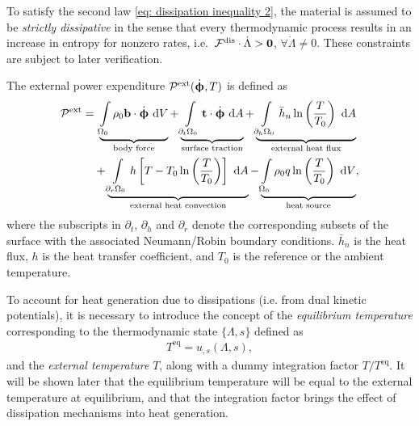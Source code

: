 To satisfy the second law \eqref{eq: dissipation inequality 2}, the material is assumed to be \emph{strictly dissipative} in the sense that every thermodynamic process results in an increase in entropy for nonzero rates, i.e.\ $\mathcal{F}^\text{dis}\cdot\dot{\Lambda} > \boldsymbol{0}$, $\forall \dot{\Lambda} \neq 0$. These constraints are subject to later verification.

The external power expenditure $\mathcal{P}^\text{ext}(\dot{\boldsymbol{\upphi}}, T)$ is defined as
\begin{equation}
\begin{aligned}
  \mathcal{P}^\text{ext} = & \ \underbrace{\int\limits_{\Omega_0} \rho_0 \textbf{b} \cdot \dot{\boldsymbol{\upphi}} \text{ d}V}_\text{body force} + \underbrace{\int\limits_{\partial_t\Omega_0} \textbf{t} \cdot \dot{\boldsymbol{\upphi}} \text{ d}A}_\text{surface traction} + \underbrace{\int\limits_{\partial_h\Omega_0} \bar{h}_n\ln\left( \dfrac{T}{T_0} \right) \text{ d}A}_\text{external heat flux} \\
                           & + \underbrace{\int\limits_{\partial_r\Omega_0} h\left[ T - T_0 \ln\left( \dfrac{T}{T_0} \right) \right] \text{ d}A}_\text{external heat convection} - \underbrace{\int\limits_{\Omega_0} \rho_0 q \ln\left( \dfrac{T}{T_0} \right) \text{ d}V}_\text{heat source},
\end{aligned}\label{eq: external power}
\end{equation}
where the subscripts in $\partial_t$, $\partial_h$ and $\partial_r$ denote the corresponding subsets of the surface with the associated Neumann/Robin boundary conditions. $\bar{h}_n$ is the heat flux, $h$ is the heat transfer coefficient, and $T_0$ is the reference or the ambient temperature.

To account for heat generation due to dissipations (i.e. from dual kinetic potentials), it is necessary to introduce the concept of the \emph{equilibrium temperature} corresponding to the thermodynamic state $\{ \Lambda, s \}$ defined as
\begin{align}
    T^\text{eq} = u_{,s}(\Lambda, s),
\end{align}
and the \emph{external temperature} $T$, along with a dummy integration factor $T/T^\text{eq}$. It will be shown later that the equilibrium temperature will be equal to the external temperature at equilibrium, and that the integration factor brings the effect of dissipation mechanisms into heat generation.

